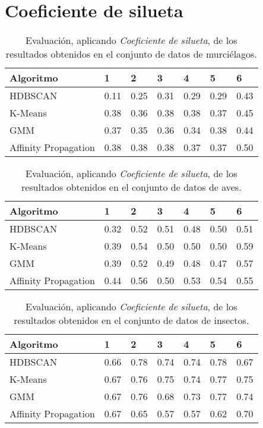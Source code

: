 \section{Coeficiente de silueta}\label{sec:silhouette-evaluation}

\begin{table}[H]
    \centering
    \begin{tabular}{lllllll}
        \hline
        Algoritmo & 1 & 2 & 3 & 4 & 5 & 6  \\ \hline
        HDBSCAN & 0.11 & 0.25 & 0.31 & 0.29 & 0.29 & 0.43 \\
        K-Means & 0.38 & 0.36 & 0.38 & 0.38 & 0.37 & 0.45 \\
        GMM & 0.37 & 0.35 & 0.36 & 0.34 & 0.38 & 0.44 \\
        Affinity Propagation & 0.38 & 0.38 & 0.38 & 0.37 & 0.37 & \cellcolor[HTML]{FFFC9E}0.50
    \end{tabular}
    \caption{Evaluación, aplicando \textit{Coeficiente de silueta}, de los resultados obtenidos en el conjunto de datos de murciélagos.}
    \label{table:bats-silhouette}
\end{table}

\begin{table}[H]
    \centering
    \begin{tabular}{lllllll}
        \hline
        Algoritmo & 1 & 2 & 3 & 4 & 5 & 6  \\ \hline
        HDBSCAN & 0.32 & 0.52 & 0.51 & 0.48 & 0.50 & 0.51 \\
        K-Means & 0.39 & 0.54 & 0.50 & 0.50 & 0.50 & \cellcolor[HTML]{FFFC9E}0.59 \\
        GMM & 0.39 & 0.52 & 0.49 & 0.48 & 0.47 & 0.57 \\
        Affinity Propagation & 0.44 & 0.56 & 0.50 & 0.53 & 0.54 & 0.55
    \end{tabular}
    \caption{Evaluación, aplicando \textit{Coeficiente de silueta}, de los resultados obtenidos en el conjunto de datos de aves.}
    \label{table:birds-silhouette}
\end{table}

\begin{table}[H]
    \centering
    \begin{tabular}{lllllll}
        \hline
        Algoritmo & 1 & 2 & 3 & 4 & 5 & 6  \\ \hline
        HDBSCAN & 0.66 & \cellcolor[HTML]{FFFC9E}0.78 & 0.74 & 0.74 & \cellcolor[HTML]{FFFC9E}0.78 & 0.67 \\
        K-Means & 0.67 & 0.76 & 0.75 & 0.74 & 0.77 & 0.75 \\
        GMM & 0.67 & 0.76 & 0.68 & 0.73 & 0.77 & 0.74 \\
        Affinity Propagation & 0.67 & 0.65 & 0.57 & 0.57 & 0.62 & 0.70
    \end{tabular}
    \caption{Evaluación, aplicando \textit{Coeficiente de silueta}, de los resultados obtenidos en el conjunto de datos de insectos.}
    \label{table:insects-silhouette}
\end{table}

